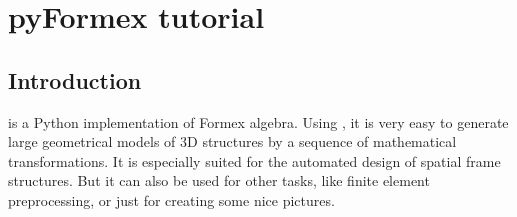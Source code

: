 
\chapter{pyFormex tutorial}
{\label{cha:tutorial}


\section{Introduction}
\label{sec:intro-tut}
\pyformex is a Python implementation of Formex algebra. Using \pyformex, it is very easy to  generate large geometrical models of 3D structures by a sequence of mathematical transformations. It is especially suited for the automated design of spatial frame structures. But it can also be used for other tasks, like finite element preprocessing, or just for creating some nice pictures.

}
